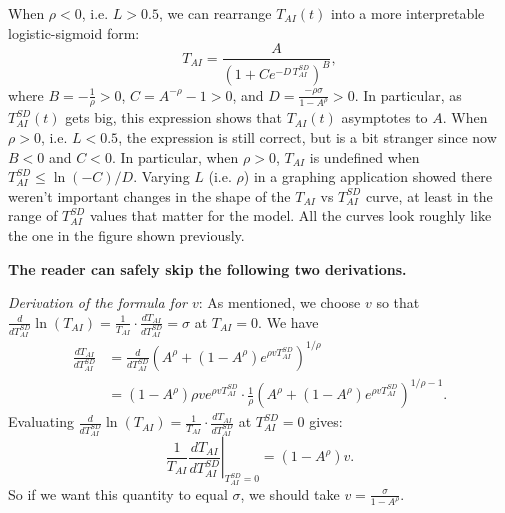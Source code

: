 \documentclass{article}
\theoremstyle{definition}
\begin{document}
When $\rho < 0$, i.e. $L > 0.5$, we can rearrange $T_{AI}(t)$ into a more interpretable logistic-sigmoid form:
\begin{equation} \label{strange logistic}
T_{AI} = \frac{A}{\left(1+Ce^{-D \, T_{AI}^{SD}} \right)^{B}},
\end{equation}
where $B = -\frac{1}{\rho} > 0$, $C = A^{-\rho} - 1 > 0$, and $D = \frac{-\rho \sigma}{1-A^\rho} > 0$. In particular, as $T_{AI}^{SD}(t)$ gets big, this expression shows that $T_{AI}(t)$ asymptotes to $A$. When $\rho > 0$, i.e. $L < 0.5$, the expression is still correct, but is a bit stranger since now $B < 0$ and $C < 0$. In particular, when $\rho > 0$, $T_{AI}$ is undefined when $T_{AI}^{SD} \leq \ln(-C)/D$. Varying $L$ (i.e. $\rho$) in a graphing application showed there weren't important changes in the shape of the $T_{AI}$ vs $T_{AI}^{SD}$ curve, at least in the range of $T_{AI}^{SD}$ values that matter for the model. All the curves look roughly like the one in the figure shown previously.

\textbf{The reader can safely skip the following two derivations.}

\textit{Derivation of the formula for $v$}: As mentioned, we choose $v$ so that $\frac{d}{d T_{AI}^{SD}} \ln(T_{AI}) = \frac{1}{T_{AI}} \cdot \frac{d T_{AI}}{d T_{AI}^{SD}} = \sigma$ at $T_{AI} = 0$. We have
\begin{equation} \label{dTAI}
\begin{aligned}
\frac{d T_{AI}}{d T_{AI}^{SD}} &= \frac{d}{d T_{AI}^{SD}} \left(A^\rho + (1-A^\rho) e^{\rho v T_{AI}^{SD}}\right)^{1/\rho} \\
&= (1-A^\rho) \rho v e^{\rho v T_{AI}^{SD}} \cdot \frac{1}{\rho} \left(A^\rho + (1-A^\rho) e^{\rho v T_{AI}^{SD}}\right)^{1/\rho - 1}.
\end{aligned}
\end{equation}
Evaluating $\frac{d}{d T_{AI}^{SD}} \ln(T_{AI}) = \frac{1}{T_{AI}} \cdot \frac{d T_{AI}}{d T_{AI}^{SD}}$ at $T_{AI}^{SD} = 0$ gives:
\[ \left.\frac{1}{T_{AI}}\frac{d T_{AI}}{d T_{AI}^{SD}}\right|_{T_{AI}^{SD} = 0} = (1-A^\rho) v.\]
So if we want this quantity to equal $\sigma$, we should take $v = \frac{\sigma}{1-A^\rho}$.
\end{document}
